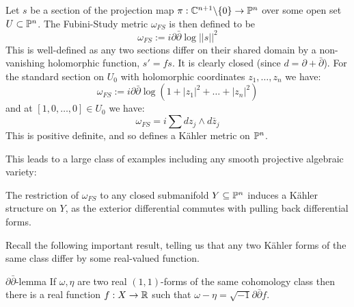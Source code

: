 \begin{example}
Let \(s\) be a section of the projection map \(\pi: \mathbb{C}^{n+1} \backslash \{0\} \to \mathbb{P}^n\) over some open set \(U \subset \mathbb{P}^n\). The Fubini-Study metric \(\omega_{FS}\) is then defined to be
\[
\omega_{FS} := i \partial \bar{\partial} \log  ||s||^2
\]
This is well-defined as any two sections differ on their shared domain by a non-vanishing holomorphic function, \(s' = fs\). It is clearly closed (since \(d = \partial + \bar{\partial}\)). For the standard section on \(U_0\) with holomorphic coordinates \(z_1,\dots,z_n\) we have:
\[
\omega_{FS} := i \partial \bar{\partial} \log ( 1 + |z_1|^2 + \dots + |z_n|^2)
\]
and at \([1,0,\dots,0] \in U_0\) we have:
\[
\omega_{FS} = i \sum dz_j \wedge d \bar{z}_j
\]
This is positive definite, and so defines a K\"ahler metric on \(\mathbb{P}^n\).
\end{example}
This leads to a large class of examples including any smooth projective algebraic variety:
\begin{example}
The restriction of \(\omega_{FS}\) to any closed submanifold \(Y \subseteq \mathbb{P}^n\) induces a K\"ahler structure on \(Y\), as the exterior differential commutes with pulling back differential forms.
\end{example}
Recall the following important result, telling us that any two K\"ahler forms of the same class differ by some real-valued function.
\begin{namedthm}{\(\partial \bar{\partial}\)-lemma}
If \(\omega, \eta\) are two real \((1,1)\)-forms of the same cohomology class then there is a real function \(f: X \to \mathbb{R}\) such that \(\omega - \eta = \sqrt{-1} \partial \bar{\partial} f\).
\end{namedthm}
